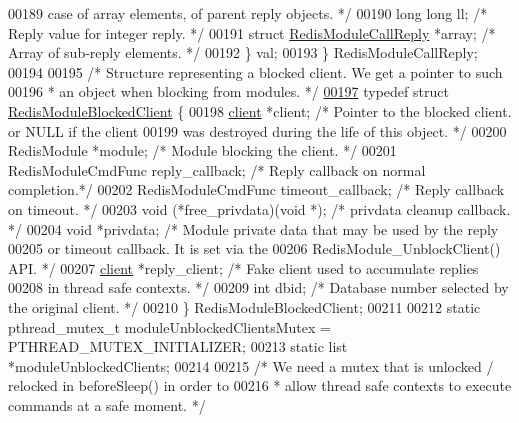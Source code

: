 \begin{DoxyCode}
00189 \textcolor{comment}{                            case of array elements, of parent reply objects. */}
00190         \textcolor{keywordtype}{long} \textcolor{keywordtype}{long} ll;    \textcolor{comment}{/* Reply value for integer reply. */}
00191         \textcolor{keyword}{struct} \hyperlink{structRedisModuleCallReply}{RedisModuleCallReply} *array; \textcolor{comment}{/* Array of sub-reply elements. */}
00192     \} val;
00193 \} RedisModuleCallReply;
00194 
00195 \textcolor{comment}{/* Structure representing a blocked client. We get a pointer to such}
00196 \textcolor{comment}{ * an object when blocking from modules. */}
\hyperlink{structRedisModuleBlockedClient}{00197} \textcolor{keyword}{typedef} \textcolor{keyword}{struct} \hyperlink{structRedisModuleBlockedClient}{RedisModuleBlockedClient} \{
00198     \hyperlink{structclient}{client} *client;  \textcolor{comment}{/* Pointer to the blocked client. or NULL if the client}
00199 \textcolor{comment}{                        was destroyed during the life of this object. */}
00200     RedisModule *module;    \textcolor{comment}{/* Module blocking the client. */}
00201     RedisModuleCmdFunc reply\_callback; \textcolor{comment}{/* Reply callback on normal completion.*/}
00202     RedisModuleCmdFunc timeout\_callback; \textcolor{comment}{/* Reply callback on timeout. */}
00203     \textcolor{keywordtype}{void} (*free\_privdata)(\textcolor{keywordtype}{void} *);       \textcolor{comment}{/* privdata cleanup callback. */}
00204     \textcolor{keywordtype}{void} *privdata;     \textcolor{comment}{/* Module private data that may be used by the reply}
00205 \textcolor{comment}{                           or timeout callback. It is set via the}
00206 \textcolor{comment}{                           RedisModule\_UnblockClient() API. */}
00207     \hyperlink{structclient}{client} *reply\_client;           \textcolor{comment}{/* Fake client used to accumulate replies}
00208 \textcolor{comment}{                                       in thread safe contexts. */}
00209     \textcolor{keywordtype}{int} dbid;           \textcolor{comment}{/* Database number selected by the original client. */}
00210 \} RedisModuleBlockedClient;
00211 
00212 \textcolor{keyword}{static} pthread\_mutex\_t moduleUnblockedClientsMutex = PTHREAD\_MUTEX\_INITIALIZER;
00213 \textcolor{keyword}{static} list *moduleUnblockedClients;
00214 
00215 \textcolor{comment}{/* We need a mutex that is unlocked / relocked in beforeSleep() in order to}
00216 \textcolor{comment}{ * allow thread safe contexts to execute commands at a safe moment. */}

\end{DoxyCode}
